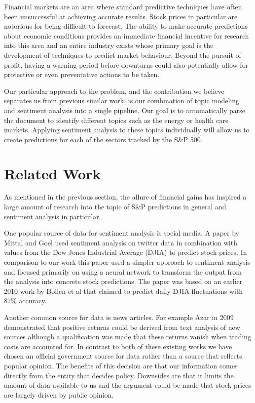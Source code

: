 \documentclass{sig-alternate-05-2015}
\begin{document}
Financial markets are an area where standard
predictive techniques have often been unsuccessful at achieving
accurate results. Stock prices in particular are notorious
for being difficult to forecast. The ability to make accurate 
predictions about economic conditions provides an immediate 
financial incentive for research into this area and an entire 
industry exists whose primary goal is the development of 
techniques to predict market behaviour. Beyond the pursuit of
profit, having a warning period before downturns could 
also potentially allow for protective or even preventative 
actions to be taken. 

Our particular approach to the problem, and the contribution we 
believe separates us from previous similar work, is our combination
of topic modeling and sentiment analysis into a single pipeline. Our
goal is to automatically parse the document to identify different
topics such as the energy or health care markets. Applying
sentiment analysis to these topics individually will allow us to create
predictions for each of the sectors tracked by the S\&P 500.

\section{Related Work}
As mentioned in the previous section, the allure of financial gains
has inspired a large amount of research into the topic of S\&P predictions
in general and sentiment analysis in particular. 

One popular source of data for sentiment analysis is social media. A paper
by Mittal and Goel used sentiment analysis on twitter data in combination
with values from the Dow Jones Industrial Average (DJIA) to predict stock prices.
In comparison to our work this paper used a simpler approach to sentiment
analysis and focused primarily on using a neural network to transform the
output from the analysis into concrete stock predictions. The paper was based
on an earlier 2010 work by Bollen et al that claimed to predict daily DJIA 
fluctuations with 87\% accuracy.\cite{bollen:twitter}

Another common source for data is news articles. For example
Azar in 2009 demonstrated that positive returns could be derived
from text analysis of new sources although a qualification was made
that these returns vanish when trading costs are accounted for.\cite{azar:thesis} In 
contrast to both of these existing works we have chosen an official
government source for data rather than a source that reflects popular opinion.
The benefits of this decision are that our information comes directly from the
entity that decides policy. Downsides are that it limits the amount of data 
available to us and the argument could be made that stock prices are largely
driven by public opinion.
\end{document}

